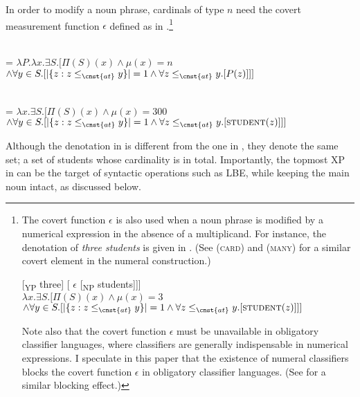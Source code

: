 \documentclass[output=paper]{langscibook}
\begin{document}
\noindent In order to modify a noun phrase, cardinals of type $n$ need the covert measurement function $\epsilon$ defined as in .\footnote{The covert function $\epsilon$ is also used when a noun phrase is modified by a numerical expression in the absence of a multiplicand. For instance, the denotation of \textit{three students} is given in . (See \citealt{Scontras2014} (\textsc{card}) and \citealt{Champollion2017} (\textsc{many}) for a similar covert element in the numeral construction.)

\ea
\ea {[} [\textsubscript{YP} three] [ $\epsilon$ [\textsubscript{NP} students]]]
\ex\label{tat:simple}  \\
$\lambda x.\exists S.[\Pi(S)(x) \wedge \mu(x) = 3$\\
\hspace*{\fill}$\wedge \forall y \in S.[\vert\{z: z\leq_{\cnst{at}}y\}\vert = 1 \wedge \forall z\leq_{\cnst{at}}y.[\textsc{student}(z)]]]$
\vspace{1mm}
\z\z

\noindent Note also that the covert function $\epsilon$ must be unavailable in obligatory classifier languages, where classifiers are generally indispensable in numerical expressions. I speculate in this paper that the existence of numeral classifiers blocks the covert function $\epsilon$ in obligatory classifier languages. (See \citealt{Chierchia1998} for a similar blocking effect.)
}

\ea
\ea\label{tat:ep}
\sib{$\epsilon$} \\
= $\lambda P.\lambda x.\exists S.[\Pi(S)(x) \wedge \mu(x) = n$\\
\hspace*{\fill}$\wedge \forall y \in S.[\vert\{z: z\leq_{\cnst{at}}y\}\vert = 1 \wedge \forall z\leq_{\cnst{at}}y.[P(z)]]]$

\ex\label{tat:ep2}
\\
 = $\lambda x.\exists S.[\Pi(S)(x) \wedge \mu(x) = 300$\\
\hspace*{\fill}$\wedge \forall y \in S.[\vert\{z: z\leq_{\cnst{at}}y\}\vert = 1 \wedge \forall z\leq_{\cnst{at}}y.[\textsc{student}(z)]]]$
\z\z

\noindent Although the denotation in  is different from the one in , they denote the same set; a set of students whose cardinality is  in total. Importantly, the topmost XP in  can be the target of syntactic operations such as LBE, while keeping the main noun intact, as discussed below.
\end{document}
